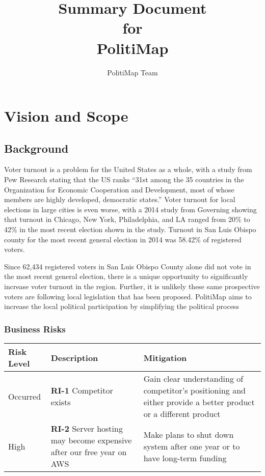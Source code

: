 \documentclass[12pt,oneside,letterpaper]{article}
\title{Summary Document\\\large for\\\Large PolitiMap}
\author{PolitiMap Team}
\begin{document}
\thispagestyle{empty}\maketitle
\tableofcontents

\newpage
\section{Vision and Scope}
% 

\subsection{Background}
Voter turnout is a problem for the United States as a whole, with a
study from Pew Research stating that the US ranks “31st among the 35
countries in the Organization for Economic Cooperation and
Development, most of whose members are highly developed, democratic
states.”  \cite{pew} Voter turnout for local elections in large cities
is even worse, with a 2014 study from Governing showing that turnout
in Chicago, New York, Philadelphia, and LA ranged from 20\% to 42\% in
the most recent election shown in the study. \cite{governing} Turnout
in San Luis Obispo county for the most recent general election in 2014
was 58.42\% of registered voters. \cite{slocounty}

Since 62,434 registered voters in San Luis Obispo County alone did not vote in the most recent
general election, there is a unique opportunity to significantly increase
voter turnout in the region. Further, it is unlikely these same prospective voters are following local legislation that has been proposed. PolitiMap aims to increase the local political participation by simplifying the political process

\subsubsection{Business Risks}
\begin{tabu}{lXX}
  \toprule
  Risk Level & Description & Mitigation \\
  \midrule
  Occurred &
  \textbf{RI-1} Competitor exists &
  Gain clear
  understanding of competitor's positioning and either provide a
  better product or a different product\\

  High &
  \textbf{RI-2} Server hosting may become expensive after our
  free year on AWS &
  Make plans to shut down system after one year or to
  have long-term funding \\
  \bottomrule
\end{tabu}
\end{document}
